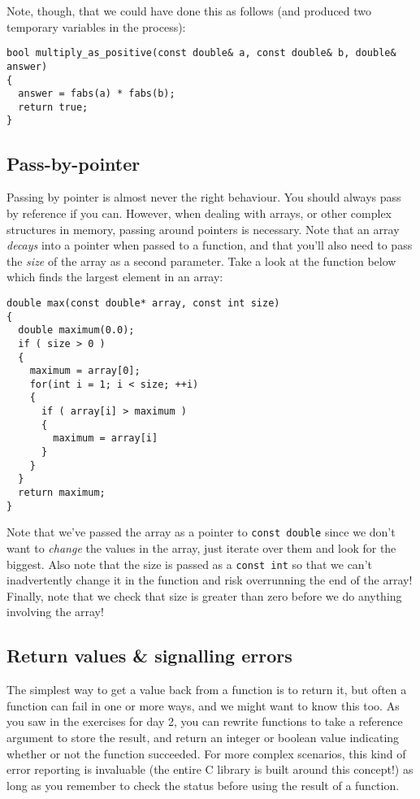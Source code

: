 \documentclass[a4paper]{scrartcl}
\begin{document}
Note, though, that we could have done this as follows (and produced two temporary variables in the process):
\begin{verbatim}
bool multiply_as_positive(const double& a, const double& b, double& answer)
{
  answer = fabs(a) * fabs(b);
  return true;
}
\end{verbatim}

\subsection{Pass-by-pointer}
Passing by pointer is almost never the right behaviour. You should always pass by reference if you can. However, when dealing with arrays, or other complex structures in memory, passing around pointers is necessary. Note that an array \emph{decays} into a pointer when passed to a function, and that you'll also need to pass the \emph{size} of the array as a second parameter. Take a look at the function below which finds the largest element in an array:
\begin{verbatim}
double max(const double* array, const int size)
{
  double maximum(0.0);
  if ( size > 0 )
  {
    maximum = array[0];
    for(int i = 1; i < size; ++i)
    {
      if ( array[i] > maximum )
      {
        maximum = array[i]
      }
    }
  }
  return maximum;
}
\end{verbatim}

Note that we've passed the array as a pointer to \verb|const double| since we don't want to \emph{change} the values in the array, just iterate over them and look for the biggest. Also note that the size is passed as a \verb|const int| so that we can't inadvertently change it in the function and risk overrunning the end of the array! Finally, note that we check that size is greater than zero before we do anything involving the array!

\subsection{Return values \& signalling errors}
The simplest way to get a value back from a function is to return it, but often a function can fail in one or more ways, and we might want to know this too. As you saw in the exercises for day 2, you can rewrite functions to take a reference argument to store the result, and return an integer or boolean value indicating whether or not the function succeeded. For more complex scenarios, this kind of error reporting is invaluable (the entire C library is built around this concept!) as long as you remember to check the status before using the result of a function.
\end{document}
